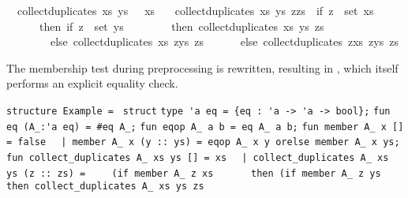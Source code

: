 \begin{isabellebody}
\ \ {\isachardoublequoteopen}collect{\isacharunderscore}duplicates\ xs\ ys\ {\isacharbrackleft}{\isacharbrackright}\ {\isacharequal}\ xs{\isachardoublequoteclose}\isanewline
\ \ {\isacharbar}\ {\isachardoublequoteopen}collect{\isacharunderscore}duplicates\ xs\ ys\ {\isacharparenleft}z{\isacharhash}zs{\isacharparenright}\ {\isacharequal}\ {\isacharparenleft}if\ z\ {\isasymin}\ set\ xs\isanewline
\ \ \ \ \ \ then\ if\ z\ {\isasymin}\ set\ ys\isanewline
\ \ \ \ \ \ \ \ then\ collect{\isacharunderscore}duplicates\ xs\ ys\ zs\isanewline
\ \ \ \ \ \ \ \ else\ collect{\isacharunderscore}duplicates\ xs\ {\isacharparenleft}z{\isacharhash}ys{\isacharparenright}\ zs\isanewline
\ \ \ \ \ \ else\ collect{\isacharunderscore}duplicates\ {\isacharparenleft}z{\isacharhash}xs{\isacharparenright}\ {\isacharparenleft}z{\isacharhash}ys{\isacharparenright}\ zs{\isacharparenright}{\isachardoublequoteclose}%
\endisatagquoteme
{\isafoldquoteme}%
%
\isadelimquoteme
%
\endisadelimquoteme
%
\begin{isamarkuptext}%
\noindent The membership test during preprocessing is rewritten,
  resulting in , which itself
  performs an explicit equality check.%
\end{isamarkuptext}%
\isamarkuptrue%
%
\isadelimquoteme
%
\endisadelimquoteme
%
\isatagquoteme
%
\begin{isamarkuptext}%
\isaverbatim%
\noindent%
\verb|structure Example = |\newline%
\verb|struct|\newline%
\newline%
\verb|type 'a eq = {eq : 'a -> 'a -> bool};|\newline%
\verb|fun eq (A_:'a eq) = #eq A_;|\newline%
\newline%
\verb|fun eqop A_ a b = eq A_ a b;|\newline%
\newline%
\verb|fun member A_ x [] = false|\newline%
\verb|  |\verb,|,\verb| member A_ x (y :: ys) = eqop A_ x y orelse member A_ x ys;|\newline%
\newline%
\verb|fun collect_duplicates A_ xs ys [] = xs|\newline%
\verb|  |\verb,|,\verb| collect_duplicates A_ xs ys (z :: zs) =|\newline%
\verb|    (if member A_ z xs|\newline%
\verb|      then (if member A_ z ys then collect_duplicates A_ xs ys zs|\newline%

\end{isamarkuptext}
\end{isabellebody}
